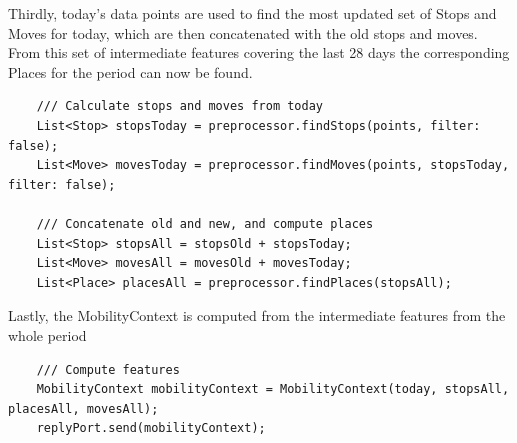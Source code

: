 Thirdly, today's data points are used to find the most updated set of Stops and Moves for today, which are then concatenated with the old stops and moves. From this set of intermediate features covering the last 28 days the corresponding Places for the period can now be found.

\begin{verbatim}
    /// Calculate stops and moves from today
    List<Stop> stopsToday = preprocessor.findStops(points, filter: false);
    List<Move> movesToday = preprocessor.findMoves(points, stopsToday, filter: false);

    /// Concatenate old and new, and compute places
    List<Stop> stopsAll = stopsOld + stopsToday;
    List<Move> movesAll = movesOld + movesToday;
    List<Place> placesAll = preprocessor.findPlaces(stopsAll);
\end{verbatim}

Lastly, the MobilityContext is computed from the intermediate features from the whole period
\begin{verbatim}
    /// Compute features
    MobilityContext mobilityContext = MobilityContext(today, stopsAll, placesAll, movesAll);
    replyPort.send(mobilityContext);
\end{verbatim}